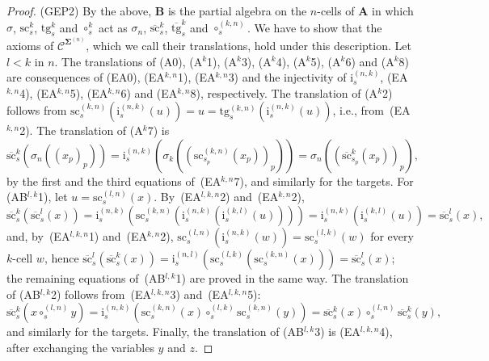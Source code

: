 \documentclass{amsart}
\theoremstyle{plain}
\theoremstyle{definition}
\begin{document}
\begin{proof}
(GEP2) By the above, $\mathbf{B}$ is the partial algebra on the $n$-cells of $\mathbf{A}$ in which $\sigma$, $\mathrm{sc}^{k}_{s}$, $\mathrm{tg}^{k}_{s}$ and $\circ^{k}_{s}$ act as $\sigma_{n}$, $\overline{\mathrm{sc}}^{k}_{s}$, $\overline{\mathrm{tg}}^{k}_{s}$ and $\circ^{(k,n)}_{s}$. We have to show that the axioms of $\boldsymbol{\mathcal{C}}^{\mathbf{\Sigma}^{(n)}}$, which we call their translations, hold under this description. Let $l<k$ in $n$. The translations of (A0), (A$^{k}$1), (A$^{k}$3), (A$^{k}$4), (A$^{k}$5), (A$^{k}$6) and (A$^{k}$8) are consequences of (EA0), (EA$^{k,n}$1), (EA$^{k,n}$3) and the injectivity of $\mathrm{i}^{(n,k)}_{s}$, (EA$^{k,n}$4), (EA$^{k,n}$5), (EA$^{k,n}$6) and (EA$^{k,n}$8), respectively. The translation of (A$^{k}$2) follows from $\mathrm{sc}^{(k,n)}_{s}(\mathrm{i}^{(n,k)}_{s}(u))=u=\mathrm{tg}^{(k,n)}_{s}(\mathrm{i}^{(n,k)}_{s}(u))$, i.e., from~(EA$^{k,n}$2). The translation of (A$^{k}$7) is
$$
\overline{\mathrm{sc}}^{k}_{s}(\sigma_{n}((x_{p})_{p}))=\mathrm{i}^{(n,k)}_{s}(\sigma_{k}((\mathrm{sc}^{(k,n)}_{s_{p}}(x_{p}))_{p}))=\sigma_{n}((\overline{\mathrm{sc}}^{k}_{s_{p}}(x_{p}))_{p}),
$$
by the first and the third equations of~(EA$^{k,n}$7), and similarly for the targets. For (AB$^{l,k}$1), let $u=\mathrm{sc}^{(l,n)}_{s}(x)$. By~(EA$^{l,k,n}$2) and~(EA$^{k,n}$2),
$$
\overline{\mathrm{sc}}^{k}_{s}(\overline{\mathrm{sc}}^{l}_{s}(x))=\mathrm{i}^{(n,k)}_{s}(\mathrm{sc}^{(k,n)}_{s}(\mathrm{i}^{(n,k)}_{s}(\mathrm{i}^{(k,l)}_{s}(u))))=\mathrm{i}^{(n,k)}_{s}(\mathrm{i}^{(k,l)}_{s}(u))=\overline{\mathrm{sc}}^{l}_{s}(x),
$$
and, by~(EA$^{l,k,n}$1) and~(EA$^{k,n}$2), $\mathrm{sc}^{(l,n)}_{s}(\mathrm{i}^{(n,k)}_{s}(w))=\mathrm{sc}^{(l,k)}_{s}(w)$ for every $k$-cell $w$, hence $\overline{\mathrm{sc}}^{l}_{s}(\overline{\mathrm{sc}}^{k}_{s}(x))=\mathrm{i}^{(n,l)}_{s}(\mathrm{sc}^{(l,k)}_{s}(\mathrm{sc}^{(k,n)}_{s}(x)))=\overline{\mathrm{sc}}^{l}_{s}(x)$; the remaining equations of~(AB$^{l,k}$1) are proved in the same way. The translation of (AB$^{l,k}$2) follows from~(EA$^{l,k,n}$3) and~(EA$^{l,k,n}$5):
$$
\overline{\mathrm{sc}}^{k}_{s}(x\circ^{(l,n)}_{s}y)=\mathrm{i}^{(n,k)}_{s}(\mathrm{sc}^{(k,n)}_{s}(x)\circ^{(l,k)}_{s}\mathrm{sc}^{(k,n)}_{s}(y))=\overline{\mathrm{sc}}^{k}_{s}(x)\circ^{(l,n)}_{s}\overline{\mathrm{sc}}^{k}_{s}(y),
$$
and similarly for the targets. Finally, the translation of (AB$^{l,k}$3) is (EA$^{l,k,n}$4), after exchanging the variables $y$ and $z$.
\end{proof}
\end{document}
